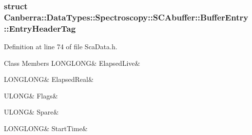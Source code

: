\subsubsection{struct Canberra\+:\+:Data\+Types\+:\+:Spectroscopy\+:\+:S\+C\+Abuffer\+:\+:Buffer\+Entry\+:\+:Entry\+Header\+Tag}


Definition at line 74 of file Sca\+Data.\+h.

\begin{DoxyFields}{Class Members}
\mbox{\label{class_canberra_1_1_data_types_1_1_spectroscopy_1_1_s_c_abuffer_1_1_buffer_entry_abb2d97b61f6cf804284fb3171c8b4197}} 
LONGLONG&
ElapsedLive&
\\
\hline

\mbox{\label{class_canberra_1_1_data_types_1_1_spectroscopy_1_1_s_c_abuffer_1_1_buffer_entry_a8553c064761fa1f0235db531e90f097f}} 
LONGLONG&
ElapsedReal&
\\
\hline

\mbox{\label{class_canberra_1_1_data_types_1_1_spectroscopy_1_1_s_c_abuffer_1_1_buffer_entry_a47e9ac00b17d8ab6d2f502cb30b9302b}} 
ULONG&
Flags&
\\
\hline

\mbox{\label{class_canberra_1_1_data_types_1_1_spectroscopy_1_1_s_c_abuffer_1_1_buffer_entry_a6a6f8dadc897ab7673c27e3892c6ea1e}} 
ULONG&
Spare&
\\
\hline

\mbox{\label{class_canberra_1_1_data_types_1_1_spectroscopy_1_1_s_c_abuffer_1_1_buffer_entry_a8c653d19c60247616213ec78e4fb3e86}} 
LONGLONG&
StartTime&
\\
\hline

\end{DoxyFields}
\label{struct_canberra_1_1_data_types_1_1_spectroscopy_1_1_s_c_abuffer_1_1_buffer_entry_1_1_s_c_adata_tag}
